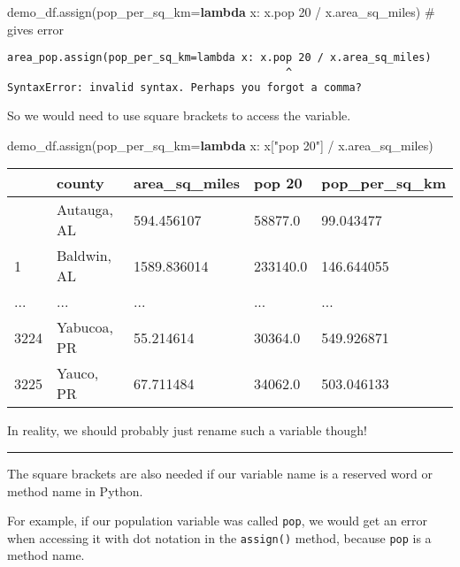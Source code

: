 \documentclass[
  letterpaper,
  DIV=11,
  numbers=noendperiod]{scrreprt}
\newenvironment{Shaded}{\begin{snugshade}}{\end{snugshade}}
\newcommand{\CommentTok}[1]{\textcolor[rgb]{0.37,0.37,0.37}{#1}}
\newcommand{\DecValTok}[1]{\textcolor[rgb]{0.68,0.00,0.00}{#1}}
\newcommand{\KeywordTok}[1]{\textcolor[rgb]{0.00,0.23,0.31}{\textbf{#1}}}
\newcommand{\NormalTok}[1]{\textcolor[rgb]{0.00,0.23,0.31}{#1}}
\newcommand{\OperatorTok}[1]{\textcolor[rgb]{0.37,0.37,0.37}{#1}}
\newcommand{\StringTok}[1]{\textcolor[rgb]{0.13,0.47,0.30}{#1}}
\begin{document}
\begin{tcolorbox}
\begin{Shaded}
\begin{Highlighting}[]
\NormalTok{demo\_df.assign(pop\_per\_sq\_km}\OperatorTok{=}\KeywordTok{lambda}\NormalTok{ x: x.pop }\DecValTok{20} \OperatorTok{/}\NormalTok{ x.area\_sq\_miles) }\CommentTok{\# gives error}
\end{Highlighting}
\end{Shaded}

\begin{verbatim}
area_pop.assign(pop_per_sq_km=lambda x: x.pop 20 / x.area_sq_miles)
                                            ^
SyntaxError: invalid syntax. Perhaps you forgot a comma?
\end{verbatim}

So we would need to use square brackets to access the variable.

\begin{Shaded}
\begin{Highlighting}[]
\NormalTok{demo\_df.assign(pop\_per\_sq\_km}\OperatorTok{=}\KeywordTok{lambda}\NormalTok{ x: x[}\StringTok{"pop 20"}\NormalTok{] }\OperatorTok{/}\NormalTok{ x.area\_sq\_miles)}
\end{Highlighting}
\end{Shaded}

\begin{longtable}[]{@{}lllll@{}}
\toprule\noalign{}
& county & area\_sq\_miles & pop 20 & pop\_per\_sq\_km \\
\midrule\noalign{}
\endhead
\bottomrule\noalign{}
\endlastfoot
0 & Autauga, AL & 594.456107 & 58877.0 & 99.043477 \\
1 & Baldwin, AL & 1589.836014 & 233140.0 & 146.644055 \\
... & ... & ... & ... & ... \\
3224 & Yabucoa, PR & 55.214614 & 30364.0 & 549.926871 \\
3225 & Yauco, PR & 67.711484 & 34062.0 & 503.046133 \\
\end{longtable}

In reality, we should probably just rename such a variable though!

\begin{center}\rule{0.5\linewidth}{0.5pt}\end{center}

The square brackets are also needed if our variable name is a reserved
word or method name in Python.

For example, if our population variable was called \texttt{pop}, we
would get an error when accessing it with dot notation in the
\texttt{assign()} method, because \texttt{pop} is a method name.


\end{tcolorbox}
\end{document}

